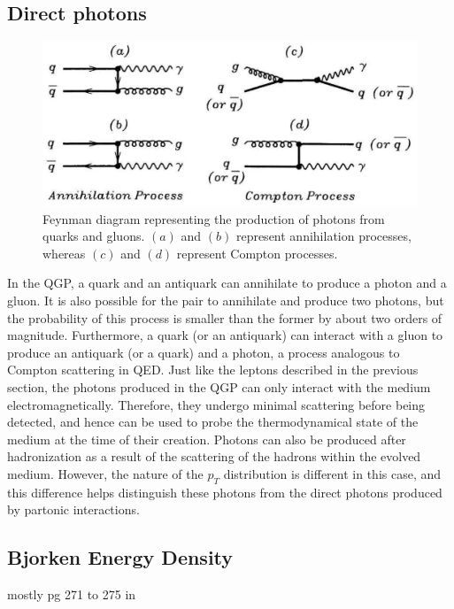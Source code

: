 \subsection{Direct photons}
\begin{figure}[h]
  \centering
  \includegraphics[width=6.5in]{figures/directPhotons.PNG}
  \caption{Feynman diagram representing the production of photons from quarks and gluons. $(a)$ and $(b)$ represent annihilation processes, whereas $(c)$ and $(d)$ represent Compton processes.\cite{wong1994introduction}}\label{fig:directPhotons}
\end{figure}

In the QGP, a quark and an antiquark can annihilate to produce a photon and a gluon. It is also possible for the pair to annihilate and produce two photons, but the probability of this process is smaller than the former by about two orders of magnitude. Furthermore, a quark (or an antiquark) can interact with a gluon to produce an antiquark (or a quark) and a photon, a process analogous to Compton scattering in QED. Just like the leptons described in the previous section, the photons produced in the QGP can only interact with the medium electromagnetically. Therefore, they undergo minimal scattering before being detected, and hence can be used to probe the thermodynamical state of the medium at the time of their creation.\cite{wong1994introduction} Photons can also be produced after hadronization as a result of the scattering of the hadrons within the evolved medium. However, the nature of the $p_{T}$ distribution is different in this case, and this difference helps distinguish these photons from the direct photons produced by partonic interactions.\cite{Wilde:2012wc}
\subsection{Bjorken Energy Density}
mostly pg 271 to 275 in \cite{Wilde:2012wc}


